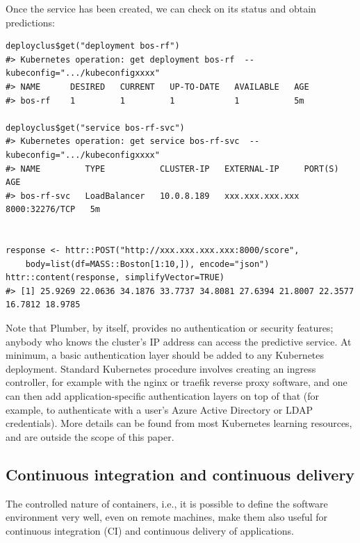 Once the service has been created, we can check on its status and obtain
predictions:

\begin{verbatim}
deployclus$get("deployment bos-rf")
#> Kubernetes operation: get deployment bos-rf  --kubeconfig=".../kubeconfigxxxx"
#> NAME      DESIRED   CURRENT   UP-TO-DATE   AVAILABLE   AGE
#> bos-rf    1         1         1            1           5m

deployclus$get("service bos-rf-svc")
#> Kubernetes operation: get service bos-rf-svc  --kubeconfig=".../kubeconfigxxxx"
#> NAME         TYPE           CLUSTER-IP   EXTERNAL-IP     PORT(S)          AGE
#> bos-rf-svc   LoadBalancer   10.0.8.189   xxx.xxx.xxx.xxx 8000:32276/TCP   5m 


response <- httr::POST("http://xxx.xxx.xxx.xxx:8000/score",
    body=list(df=MASS::Boston[1:10,]), encode="json")
httr::content(response, simplifyVector=TRUE)
#> [1] 25.9269 22.0636 34.1876 33.7737 34.8081 27.6394 21.8007 22.3577 16.7812 18.9785
\end{verbatim}

Note that Plumber, by itself, provides no authentication or security
features; anybody who knows the cluster's IP address can access the
predictive service. At minimum, a basic authentication layer should be
added to any Kubernetes deployment. Standard Kubernetes procedure
involves creating an ingress controller, for example with the nginx or
traefik reverse proxy software, and one can then add
application-specific authentication layers on top of that (for example,
to authenticate with a user's Azure Active Directory or LDAP
credentials). More details can be found from most Kubernetes learning
resources, and are outside the scope of this paper.

\hypertarget{continuous-integration-and-continuous-delivery-colinfaynoamross-colinfay}{%
\subsection{\texorpdfstring{Continuous integration and continuous
delivery
\citep[\citet{ColinFay}]{noamross}}{Continuous integration and continuous delivery , @ColinFay{[}@noamross, @ColinFay{]}}}\label{continuous-integration-and-continuous-delivery-colinfaynoamross-colinfay}}

The controlled nature of containers, i.e., it is possible to define the
software environment very well, even on remote machines, make them also
useful for continuous integration (CI) and continuous delivery of
applications.


